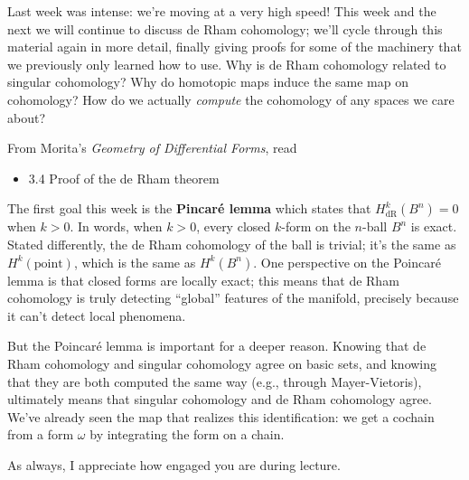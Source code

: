 \documentclass{homework}
\author{Jim Fowler}
\date{Week 8: Poincar\'e lemma}
\DeclareMathOperator{\dR}{dR}
\begin{document}
\maketitle

Last week was intense: we're moving at a very high speed!  This week
and the next we will continue to discuss de Rham cohomology; we'll
cycle through this material again in more detail, finally giving
proofs for some of the machinery that we previously only learned how
to use.  Why is de Rham cohomology related to singular cohomology?
Why do homotopic maps induce the same map on cohomology?  How do we
actually \textit{compute} the cohomology of any spaces we care about?

From Morita's \textit{Geometry of Differential Forms}, read
\begin{itemize}
\item 3.4 Proof of the de Rham theorem
\end{itemize}

The first goal this week is the \textbf{Pincar\'e lemma} which states
that $H_{\dR}^k(B^n) = 0$ when $k > 0$.  In words, when $k > 0$, every
closed $k$-form on the $n$-ball $B^n$ is exact.  Stated differently,
the de Rham cohomology of the ball is trivial; it's the same as
$H^k(\mbox{point})$, which is the same as $H^k(B^n)$.  One perspective
on the Poincar\'e lemma is that closed forms are locally exact; this
means that de Rham cohomology is truly detecting ``global'' features
of the manifold, precisely because it can't detect local phenomena.

But the Poincar\'e lemma is important for a deeper reason.  Knowing
that de Rham cohomology and singular cohomology agree on basic sets,
and knowing that they are both computed the same way (e.g., through
Mayer-Vietoris), ultimately means that singular cohomology and de Rham
cohomology agree.  We've already seen the map that realizes this
identification: we get a cochain from a form $\omega$ by integrating
the form on a chain.

As always, I appreciate how engaged you are during lecture.
\end{document}
